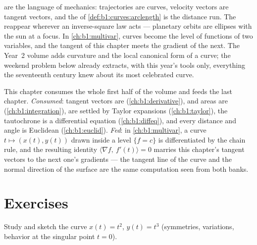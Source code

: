 \begin{remark}
\label{rem:b1:curves:whereused}
 are the language of mechanics: trajectories
are curves, velocity vectors are tangent vectors, and the  of \cref{def:b1:curves:arclength} is the distance run. The
 reappear wherever an inverse-square law acts --- planetary
orbits are ellipses with the sun at a focus. In
\cref{ch:b1:multivar}, curves become the level  of functions
of two variables, and the tangent of this chapter meets the
gradient of the next. The Year~2 volume adds curvature and the
local canonical form of a curve; the weekend problem below
already extracts, with this year's tools only, everything the
seventeenth century knew about its most celebrated curve.
\end{remark}

\begin{remark}
\label{rem:b1:curves:perspectives}
This chapter consumes the whole first half of the volume and
feeds the last chapter. \emph{Consumed}: tangent vectors are
 (\cref{ch:b1:derivative}),  and areas are
 (\cref{ch:b1:integration}),  are settled by
Taylor expansions (\cref{ch:b1:taylor}), the tautochrone is a
 differential equation (\cref{ch:b1:diffeq}), and every
distance and angle is Euclidean (\cref{ch:b1:euclid}).
\emph{Fed}: in \cref{ch:b1:multivar}, a curve $t \mapsto (x(t),
y(t))$ drawn inside a level  $\{f = c\}$ is differentiated by
the chain rule, and the resulting identity $\langle \nabla f,\
f'(t)\rangle = 0$ marries this chapter's tangent vectors to the
next one's gradients --- the tangent line of the curve and the
normal direction of the surface are the same computation seen
from both banks.
\end{remark}

\section{Exercises}

\begin{exercise}[$\star$]\label{exo:b1:curves:1}
Study and sketch the curve $x(t) = t^2$, $y(t) = t^3$ (symmetries,
variations, behavior at the singular point $t = 0$).
\end{exercise}

